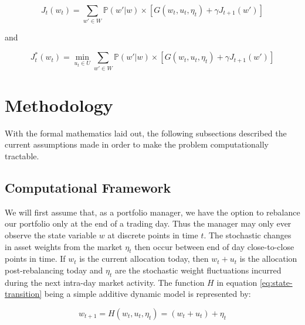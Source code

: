 \documentclass{article}
\begin{document}
\begin{equation}
J_t(w_t) = \sum_{w' \in W} \mathbb{P}(w' | w) \times [G(w_t, u_t, \eta_t) + \gamma J_{t+1}(w')] \label{eq:bellman-det}
\end{equation}

and 

\begin{equation}
J_t^*(w_t) = \min_{u_t \in U} \sum_{w' \in W} \mathbb{P}(w' | w) \times [G(w_t, u_t, \eta_t) + \gamma J_{t+1}(w')] \label{eq:bellman-opt-det}
\end{equation}

\section{Methodology}

With the formal mathematics laid out, the following subsections described the current assumptions made in order to make the problem computationally tractable.

\subsection{Computational Framework}

We will first assume that, as a portfolio manager, we have the option to rebalance our portfolio only at the end of a trading day. Thus the manager may only ever observe the state variable $w$ at discrete points in time $t$. The stochastic changes in asset weights from the market $\eta_t$ then occur between end of day close-to-close points in time. If $w_t$ is the current allocation today, then $w_t + u_t$ is the allocation post-rebalancing today and $\eta_t$ are the stochastic weight fluctuations incurred during the next intra-day market activity. The function $H$ in equation \ref{eq:state-transition} being a simple additive dynamic model is represented by:

\begin{equation}
w_{t+1} = H(w_t, u_t, \eta_t) = (w_t + u_t) + \eta_t
\end{equation}
\end{document}
